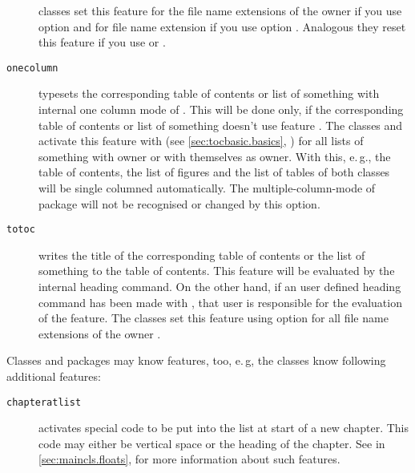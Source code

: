 \begin{description}
  \KOMAScript{} classes set this feature for the file name extensions of the
  owner  if you use option %
   and for file name extension
   if you use option
  . Analogous they reset this feature if
  you use %
   or
  .
\item[\texttt{onecolumn}] \leavevmode{}%
  typesets the corresponding table of contents or list of something with
  internal one column mode of
  . This will be
  done only, if the corresponding table of contents or list of something
  doesn't use feature . The
  \KOMAScript{} classes  and  activate this
  feature with  (see \autoref{sec:tocbasic.basics},
  ) for all lists of something
  with owner  or with themselves as owner. With this, e.\,g.,
  the table of contents, the list of figures and the list of tables of both
  classes will be single columned automatically. The multiple-column-mode of
  package  will not be recognised or
  changed by this option.
\item[\texttt{totoc}] writes the title of the corresponding table of contents
  or the list of something to the table of contents. This feature will be
  evaluated by the internal heading command. On the other hand, if an user
  defined heading command has been made with , that user
  is responsible for the evaluation of the feature. The \KOMAScript{} classes
  set this feature using option
   for all file name extensions of the
  owner .
\end{description}
Classes and packages may know features, too, e.\,g, the \KOMAScript{} classes
know following additional features:
\begin{description}
\item[\texttt{chapteratlist}] activates special code to be put into the list
  at start of a new chapter. This code may either be vertical space or the
  heading of the chapter.
  See  in
  \autoref{sec:maincls.floats},  for
  more information about such features.
\end{description}
